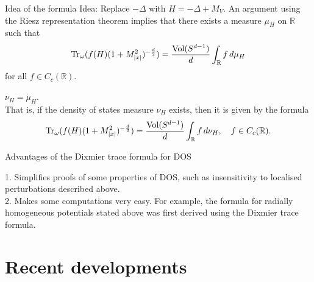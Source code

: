 \documentclass{beamer}
\numberwithin{equation}{section}
\theoremstyle{plain}
\theoremstyle{plain}
\theoremstyle{definition}
\theoremstyle{plain}
\theoremstyle{plain}
\theoremstyle{definition}
\newcommand{\tr}{{\rm Tr}}
\newcommand{\Vol}{\mathrm{Vol}}
\newcommand{\Rl}{\mathbb{R}}
\begin{document}
\begin{frame}{Idea of the formula}
    Idea: Replace $-\Delta$ with $H = -\Delta+M_V$. An argument using the Riesz representation theorem implies that there exists a measure $\mu_H$ on $\Rl$ such that 
    $$
        \tr_{\omega}(f(H)(1+M_{|x|}^2)^{-\frac{d}{2}}) = \frac{\Vol(S^{d-1})}{d}\int_{\Rl} f\,d\mu_H
    $$
    for all $f \in C_c(\Rl).$\\
    
    \begin{theorem}
        $\nu_H = \mu_H$.\\
        
        That is, if the density of states measure $\nu_H$ exists, then it is given by the formula
        $$
            \tr_{\omega}(f(H)(1+M_{|x|}^2)^{-\frac{d}{2}}) = \frac{\Vol(S^{d-1})}{d}\int_{\Rl} f\,d\nu_H,\quad f \in C_c(\Rl).
        $$
    \end{theorem}
\end{frame} 


\begin{frame}{Advantages of the Dixmier trace formula for DOS}

1. Simplifies proofs of some properties of DOS, such as insensitivity to localised perturbations described above.\\

2. Makes some computations very easy. For example, the formula for radially homogeneous potentials stated above was first derived using the Dixmier trace formula.
\end{frame}


\section{Recent developments}
\end{document}
